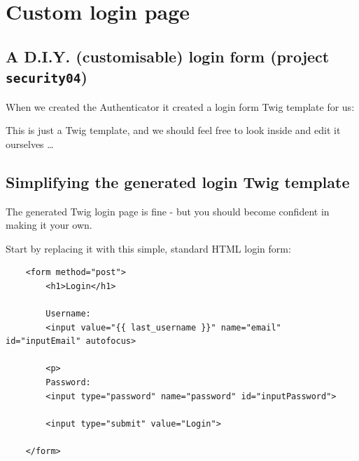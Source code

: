 \documentclass[a4paperpaper,openright]{book}
\newenvironment{Shaded}{}{}
\newcommand{\ExtensionTok}[1]{#1}
\newcommand{\NormalTok}[1]{#1}
\begin{document}
\hypertarget{custom-login-page}{%
\chapter{Custom login page}\label{custom-login-page}}

\hypertarget{a-d.i.y.-customisable-login-form-project-security04}{%
\section{\texorpdfstring{A D.I.Y. (customisable) login form (project
\texttt{security04})}{A D.I.Y. (customisable) login form (project security04)}}\label{a-d.i.y.-customisable-login-form-project-security04}}

When we created the Authenticator it created a login form Twig template
for us:

\begin{Shaded}
\end{Shaded}

This is just a Twig template, and we should feel free to look inside and
edit it ourselves \ldots{}

\hypertarget{simplifying-the-generated-login-twig-template}{%
\section{Simplifying the generated login Twig
template}\label{simplifying-the-generated-login-twig-template}}

The generated Twig login page is fine - but you should become confident
in making it your own.

Start by replacing it with this simple, standard HTML login form:

\begin{verbatim}
    <form method="post">
        <h1>Login</h1>

        Username:
        <input value="{{ last_username }}" name="email" id="inputEmail" autofocus>

        <p>
        Password:
        <input type="password" name="password" id="inputPassword">

        <input type="submit" value="Login">

    </form>
\end{verbatim}
\end{document}
